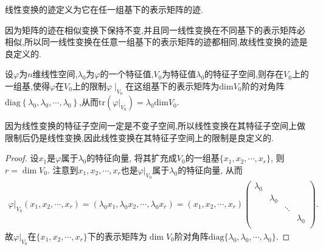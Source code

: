 \documentclass[../../main.tex]{subfiles}%
\begin{document}
\begin{definition}[线性变换的迹]
线性变换的迹定义为它在任一组基下的表示矩阵的迹.
\end{definition}
\begin{remark}
因为矩阵的迹在相似变换下保持不变,并且同一线性变换在不同基下的表示矩阵必相似,所以同一线性变换在任意一组基下的表示矩阵的迹都相同,故线性变换的迹是良定义的.
\end{remark}

\begin{proposition}\label{proposition:线性变换在其特征子空间上的限制的表示矩阵及迹}
设$\varphi$为$n$维线性空间,$\lambda_0$为$\varphi$的一个特征值,$V_0$为特征值$\lambda_0$的特征子空间,则存在$V_0$上的一组基,使得$\varphi$在$V_0$上的限制$\varphi\mid_{V_0}$在这组基下的表示矩阵为$\mathrm{dim}V_0$阶的对角阵$\mathrm{diag}\left\{ \lambda _0,\lambda _0,\cdots ,\lambda _0 \right\}$,从而$\mathrm{tr}\left( \varphi |_{V_0} \right) =\lambda _0\mathrm{dim}V_0$.
\end{proposition}
\begin{remark}
因为线性变换的特征子空间一定是不变子空间,所以线性变换在其特征子空间上做限制后仍是线性变换,因此线性变换在其特征子空间上的限制是良定义的.
\end{remark}
\begin{proof}
设\(x_1\)是\(\varphi\)属于\(\lambda_0\)的特征向量, 将其扩充成\(V_0\)的一组基\(\{ x_1,x_2,\cdots ,x_r \}\), 则\(r = \dim V_0\).
注意到\(x_1,x_2,\cdots ,x_r\)也是\(\varphi|_{V_0}\)属于\(\lambda_0\)的特征向量, 从而
\begin{align*}
\varphi|_{V_0}( x_1,x_2,\cdots ,x_r )=(\lambda_0x_1,\lambda_0x_2,\cdots ,\lambda_0x_r)
=( x_1,x_2,\cdots ,x_r )\begin{pmatrix}
\lambda_0& & & \\
& \lambda_0& & \\
& & \ddots& \\
& & & \lambda_0\\
\end{pmatrix}.
\end{align*}
故\(\varphi|_{V_0}\)在\(\{ x_1,x_2,\cdots ,x_r \}\)下的表示矩阵为\(\dim V_0\)阶对角阵\(\mathrm{diag}\{ \lambda_0,\lambda_0,\cdots ,\lambda_0 \}\).
\end{proof}
\end{document}
